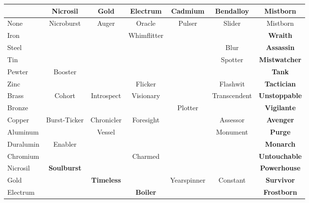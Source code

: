 \documentclass[conference]{IEEEtran}
\begin{document}
\begin{table}[h]
\begin{center}
\begin{tabular}{|l |c |c |c |c |c |c | }
		\cellcolor{black}&Nicrosil&Gold&Electrum&Cadmium&Bendalloy&Mistborn\\\hline
		
		\hline
		None&\cellcolor{darkgreen}Nicroburst&\cellcolor{darkgreen}Auger&\cellcolor{darkgreen}Oracle&\cellcolor{darkgreen}Pulser&\cellcolor{darkgreen}Slider&\cellcolor{darkgreen}Mistborn\\\hline
		Iron& & &\cellcolor{lightgreen}Whimflitter& & & \cellcolor{lightblue} \textbf{Wraith}\\\hline
		Steel& & & & &\cellcolor{lightgreen} Blur& \cellcolor{lightblue} \textbf{Assassin}\\\hline
		Tin& & & & & \cellcolor{lightgreen}Spotter & \cellcolor{lightblue} \textbf{Mistwatcher}\\\hline
		Pewter&\cellcolor{lightgreen}Booster& & & & & \cellcolor{lightblue} \textbf{Tank}\\\hline
		Zinc & & &\cellcolor{lightgreen}Flicker& &\cellcolor{lightgreen}Flashwit& \cellcolor{lightblue} \textbf{Tactician}\\\hline
		Brass &\cellcolor{lightorange}Cohort&\cellcolor{lightorange}Introspect &\cellcolor{lightred} Visionary & &\cellcolor{lightorange}Transcendent & \cellcolor{lightblue} \textbf{Unstoppable}\\\hline
		Bronze&& & &\cellcolor{lightgreen}Plotter & & \cellcolor{lightblue} \textbf{Vigilante}\\\hline
		Copper&\cellcolor{lightgreen}Burst-Ticker &\cellcolor{lightgreen} Chronicler & \cellcolor{lightgreen}Foresight & &  \cellcolor{lightgreen}Assessor& \cellcolor{lightblue} \textbf{Avenger}\\\hline
		Aluminum & & \cellcolor{lightgreen} Vessel& & &\cellcolor{lightgreen}Monument& \cellcolor{lightblue} \textbf{Purge}\\\hline
		Duralumin&\cellcolor{lightgreen}Enabler& & & & & \cellcolor{lightblue} \textbf{Monarch}\\\hline
		Chromium &  & & \cellcolor{lightgreen}Charmed &  &  &  \cellcolor{lightblue} \textbf{Untouchable}\\\hline
		Nicrosil& \cellcolor{lightgreen}\textbf{Soulburst} & &  &  &  &  \cellcolor{lightblue} \textbf{Powerhouse}\\\hline
		Gold&  & \cellcolor{lightgreen}\textbf{Timeless} &  &\cellcolor{lightgreen} Yearspinner &\cellcolor{lightgreen} Constant &  \cellcolor{lightblue} \textbf{Survivor}\\\hline
		Electrum& & &\cellcolor{lightred}\textbf{Boiler} & & & \cellcolor{lightblue} \textbf{Frostborn}\\\hline

\end{tabular}
\end{center}
\end{table}
\end{document}
